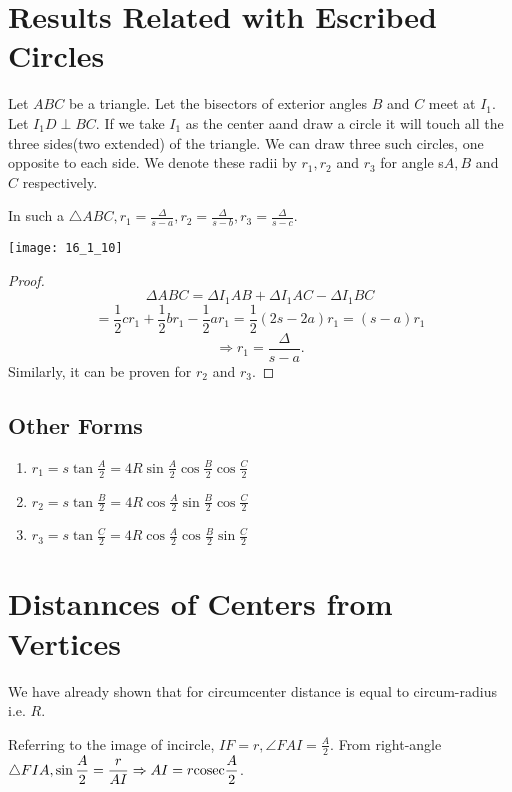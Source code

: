\section{Results Related with Escribed Circles}
Let $ABC$ be a triangle. Let the bisectors of exterior angles $B$ and $C$ meet at $I_1$. Let $I_1D\perp BC$. If we take $I_1$ as
the center aand draw a circle it will touch all the three sides(two extended) of the triangle. We can draw three such circles, one
opposite to each side. We denote these radii by $r_1, r_2$ and $r_3$ for angle s$A, B$ and $C$ respectively.
\begin{theorem}
  In such a $\triangle ABC, r_1 = \frac{\Delta}{s - a}, r_2 = \frac{\Delta}{s - b}, r_3 = \frac{\Delta}{s - c}$.
\begin{center}
  \texttt{[image: 16\_1\_10]}
  \label{fig:esc}
\end{center}
\end{theorem}

\begin{proof}
  $$\Delta ABC = \Delta I_1AB + \Delta I_1AC - \Delta I_1BC$$
  $$=\frac{1}{2}cr_1 + \frac{1}{2}br_1 - \frac{1}{2}ar_1 = \frac{1}{2}(2s - 2a)r_1 = (s - a)r_1$$
  $$\Rightarrow r_1 = \frac{\Delta}{s - a}.$$
  Similarly, it can be proven for $r_2$ and $r_3$.
\end{proof}

\subsection{Other Forms}
\begin{enumerate}
\item $r_1 = s\tan\frac{A}{2} = 4R\sin\frac{A}{2}\cos\frac{B}{2}\cos\frac{C}{2}$
\item $r_2 = s\tan\frac{B}{2} = 4R\cos\frac{A}{2}\sin\frac{B}{2}\cos\frac{C}{2}$
\item $r_3 = s\tan\frac{C}{2} = 4R\cos\frac{A}{2}\cos\frac{B}{2}\sin\frac{C}{2}$
\end{enumerate}

\section{Distannces of Centers from Vertices}
We have already shown that for circumcenter distance is equal to circum-radius i.e. $R$.

Referring to the image of incircle, $IF = r, \angle FAI = \frac{A}{2}$. From right-angle $\triangle FIA, \sin\frac{A}{2} =
\frac{r}{AI}\Rightarrow AI = r{\rm cosec}\frac{A}{2}$.

